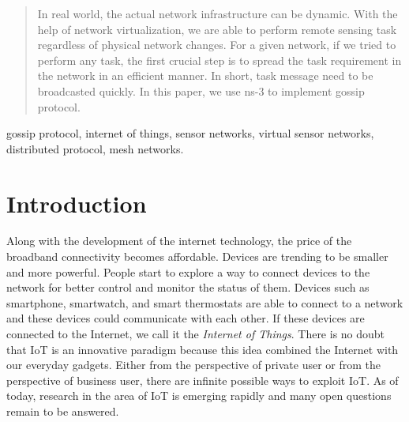 \documentclass[12pt,journal]{IEEEtran}
\begin{document}
\begin{abstract}
In real world, the actual network infrastructure can be dynamic. With the help of network virtualization, we are able to perform remote sensing task regardless of physical network changes. For a given network, if we tried to perform any task, the first crucial step is to spread the task requirement in the network in an efficient manner. In short, task message need to be broadcasted quickly. In this paper, we use ns-3 to implement gossip protocol.  
\end{abstract}

\begin{IEEEkeywords}
gossip protocol, internet of things, sensor networks, virtual sensor networks, distributed protocol, mesh networks.
\end{IEEEkeywords}






%
\IEEEpeerreviewmaketitle



\section{Introduction}
% 
% 
% 
% 
\IEEEPARstart
{A}{long} with the development of the internet technology, the price of the broadband connectivity becomes affordable. Devices are trending to be  smaller and more powerful. People start to explore a way to connect devices to the network for better control and monitor the status of them. Devices such as smartphone, smartwatch, and smart thermostats are able to connect to a network and these devices could communicate with each other. If these devices are connected to the Internet, we call it the \textit{Internet of Things}. There is no doubt that IoT is an innovative paradigm \cite{Atzori} because this idea combined the Internet with our everyday gadgets. Either from the perspective of private user or from the perspective of business user, there are infinite possible ways to exploit IoT. As of today, research in the area of IoT is emerging rapidly and many open questions remain to be answered.
\end{document}
